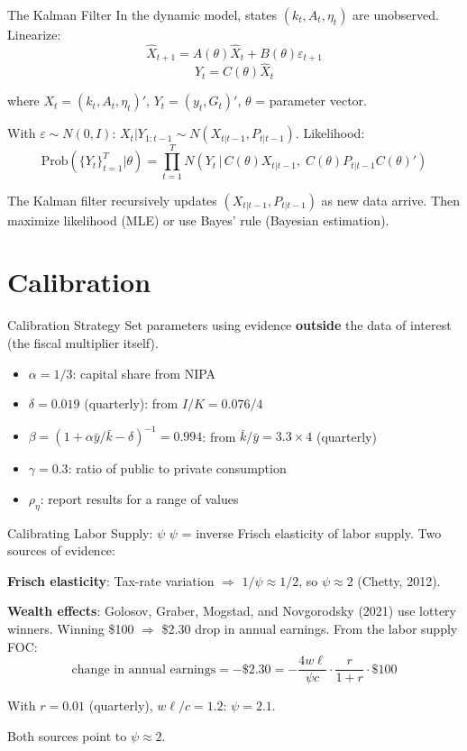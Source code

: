 \documentclass[blue]{beamer}
\begin{document}
\begin{frame}{The Kalman Filter}
	In the dynamic model, states $(k_t, A_t, \eta_t)$ are unobserved. Linearize:
	\[
	\hat{X}_{t+1} = A(\theta) \hat{X}_t + B(\theta) \varepsilon_{t+1}
	\]
	\[
	\hat{Y}_t = C(\theta) \hat{X}_t
	\]
	
	where $X_t = (k_t, A_t, \eta_t)'$, $Y_t = (y_t, G_t)'$, $\theta$ = parameter vector.
	
	\bigskip
	With $\varepsilon \sim N(0, I)$: $X_t | Y_{1:t-1} \sim N(X_{t|t-1}, P_{t|t-1})$. Likelihood:
	\[
	\text{Prob}(\{Y_t\}_{t=1}^{T} | \theta) = \prod_{t=1}^{T} N\!\left(Y_t \,\big|\, C(\theta) X_{t|t-1},\; C(\theta) P_{t|t-1} C(\theta)'\right)
	\]
	
	The Kalman filter recursively updates $(X_{t|t-1}, P_{t|t-1})$ as new data arrive. Then maximize likelihood (MLE) or use Bayes' rule (Bayesian estimation).
\end{frame}

\section{Calibration}

\begin{frame}{Calibration Strategy}
	Set parameters using evidence \textbf{outside} the data of interest (the fiscal multiplier itself).
	
	\bigskip
	\begin{itemize}
		\item $\alpha = 1/3$: capital share from NIPA
		\item $\delta = 0.019$ (quarterly): from $I/K = 0.076/4$
		\item $\beta = (1 + \alpha \bar{y}/\bar{k} - \delta)^{-1} = 0.994$: from $\bar{k}/\bar{y} = 3.3 \times 4$ (quarterly)
		\item $\gamma = 0.3$: ratio of public to private consumption
		\item $\rho_\eta$: report results for a range of values
	\end{itemize}
\end{frame}

\begin{frame}{Calibrating Labor Supply: $\psi$}
	$\psi$ = inverse Frisch elasticity of labor supply. Two sources of evidence:
	
	\bigskip
	\textbf{Frisch elasticity}: Tax-rate variation $\Rightarrow$ $1/\psi \approx 1/2$, so $\psi \approx 2$ (Chetty, 2012).
	
	\bigskip
	\textbf{Wealth effects}: Golosov, Graber, Mogstad, and Novgorodsky (2021) use lottery winners. Winning \$100 $\Rightarrow$ \$2.30 drop in annual earnings. From the labor supply FOC:
	\[
	\text{change in annual earnings} = -\$2.30 = -\frac{4 w\ell}{\psi c} \cdot \frac{r}{1+r} \cdot \$100
	\]
	
	With $r = 0.01$ (quarterly), $w\ell/c = 1.2$: $\psi = 2.1$.
	
	\bigskip
	Both sources point to $\psi \approx 2$.
\end{frame}
\end{document}
